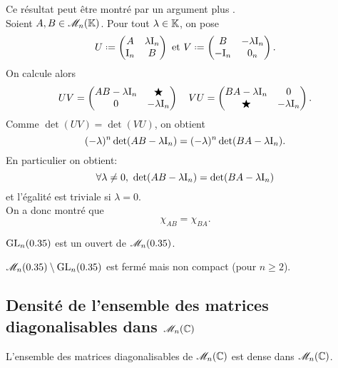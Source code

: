 Ce résultat peut être montré par un argument plus . \\
Soient $A, B \in \mathscr{M}_n(\mathbb{K})$. Pour tout $\lambda \in \mathbb{K}$, on pose
$$
U \defeq
\begin{pmatrix}
    A & \lambda \I_n \\
    \I_n & B
\end{pmatrix}
\text{ et }
V \defeq 
\begin{pmatrix}
    B & -\lambda \I_n \\
    -\I_n & 0_n
\end{pmatrix}.
$$
On calcule alors
$$UV = 
\begin{pmatrix}
    AB - \lambda \mathrm{I}_n & \bigstar \\
    0 & -\lambda \mathrm{I}_n
\end{pmatrix}
\quad
VU = 
\begin{pmatrix}
    BA - \lambda \mathrm{I}_n & 0 \\
    \bigstar & -\lambda \mathrm{I}_n
\end{pmatrix}.
$$
Comme $\det(UV) = \det(VU)$, on obtient
$$(-\lambda)^n \det(AB - \lambda \mathrm{I}_n) = (-\lambda)^n \det(BA - \lambda \mathrm{I}_n).$$
En particulier on obtient:
$$\forall \lambda \not= 0,\ \det(AB - \lambda \mathrm{I}_n) = \det(BA - \lambda \mathrm{I}_n)$$
et l'égalité est triviale si $\lambda = 0$. \\
On a donc montré que 
$$\chi_{A B} = \chi_{B A}.$$

\begin{prop}{}
    $\mathrm{GL}_n(0.35)$ est un ouvert de $\mathscr{M}_n(0.35)$.
\end{prop}

\begin{preuve}
    
\end{preuve}

\begin{prop}
    $\mathscr{M}_n(0.35) \setminus \mathrm{GL}_n(0.35)$ est fermé mais non compact (pour $n \geqslant 2$).
\end{prop}

\subsection{Densité de l'ensemble des matrices diagonalisables dans \texorpdfstring{$\mathscr{M}_n(\mathbb{C})$}{M_n(C)}}

\begin{theo}{}
    L'ensemble des matrices diagonalisables de $\mathscr{M}_n(\mathbb{C})$ est dense dans $\mathscr{M}_n(\mathbb{C})$.
\end{theo}

